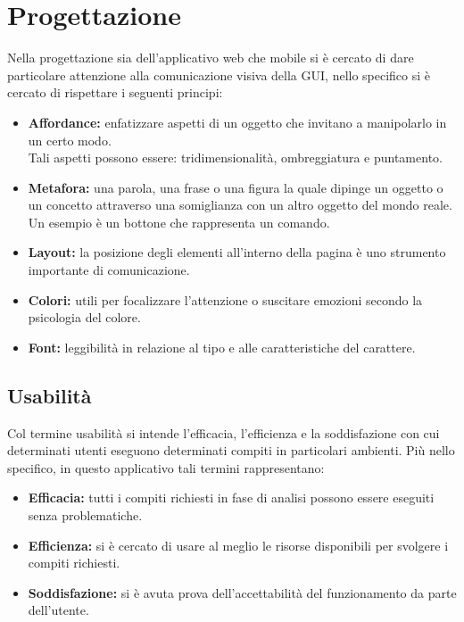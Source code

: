 \documentclass[a4paper,final,12pt]{report}
\begin{document}
\section{Progettazione}
Nella progettazione sia dell'applicativo web che mobile si è cercato di dare particolare attenzione alla comunicazione visiva della GUI, nello specifico si è cercato di rispettare i seguenti principi:
\begin{itemize}
\item \textbf{Affordance:} enfatizzare aspetti di un oggetto che invitano a manipolarlo in un certo modo.\\ Tali aspetti possono essere: tridimensionalità, ombreggiatura e puntamento.
\item \textbf{Metafora:} una parola, una frase o una figura la quale dipinge un oggetto o un concetto attraverso una somiglianza con un altro oggetto del mondo reale. Un esempio è un bottone che rappresenta un comando.
\item \textbf{Layout:} 
la posizione degli elementi all'interno della pagina è uno strumento importante di comunicazione.
\item \textbf{Colori:} utili per focalizzare l'attenzione o suscitare emozioni secondo la psicologia del colore.
\item \textbf{Font:} leggibilità in relazione al tipo e alle caratteristiche del carattere.
\end{itemize}

\subsection{Usabilità}
Col termine usabilità si intende l'efficacia, l'efficienza e la soddisfazione con cui determinati utenti eseguono determinati compiti in particolari ambienti. 
Più nello specifico, in questo applicativo tali termini rappresentano:
\begin{itemize}
\item \textbf{Efficacia:} tutti i compiti richiesti in fase di analisi possono essere eseguiti senza problematiche.
\item \textbf{Efficienza:} si è cercato di usare al meglio le risorse disponibili per svolgere i compiti richiesti.
\item \textbf{Soddisfazione:} si è avuta prova dell'accettabilità del funzionamento da parte dell'utente.
\end{itemize}
\end{document}
